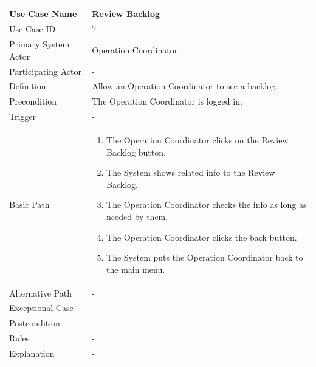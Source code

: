 \documentclass[a4paper,12pt]{report}
\begin{document}
		\begin{tabular}{|m{4cm}|m{11.5cm}|}
			\hline
				Use Case Name & Review Backlog\\
			\hline
				Use Case ID & 7\\
			\hline
				Primary System Actor & Operation Coordinator\\
			\hline
				Participating Actor & -\\
			\hline
				Definition & Allow an Operation Coordinator to see a backlog.\\
			\hline
				Precondition & The Operation Coordinator is logged in.\\
			\hline
				Trigger & -\\
			\hline
				Basic Path & \begin{enumerate}
					\item The Operation Coordinator clicks on the Review Backlog button.
					\item The System shows related info to the Review Backlog.
					\item The Operation Coordinator checks the info as long as needed by them.
					\item The Operation Coordinator clicks the back button.
					\item The System puts the Operation Coordinator back to the main menu.
				\end{enumerate}		
				\\
			\hline
				Alternative Path & -\\
			\hline
				Exceptional Case & -\\
			\hline
				Postcondition & -\\
			\hline
				Rules & -\\
			\hline
				Explanation & -\\
			\hline
		\end{tabular}
\end{document}
